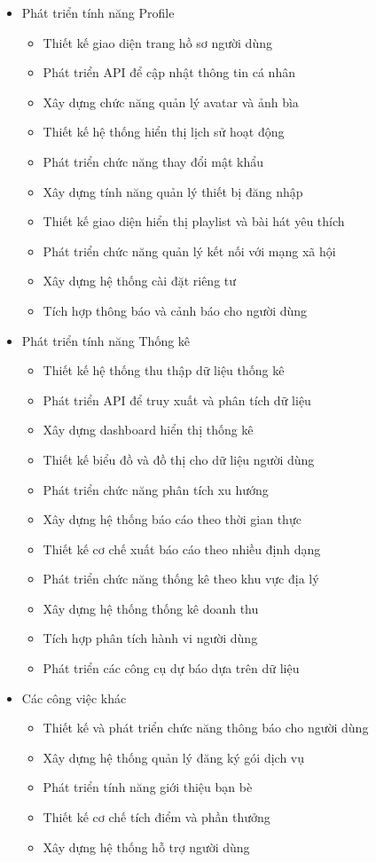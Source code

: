 \begin{itemize}
    \item Phát triển tính năng Profile
    \begin{itemize}
        \item Thiết kế giao diện trang hồ sơ người dùng
        \item Phát triển API để cập nhật thông tin cá nhân
        \item Xây dựng chức năng quản lý avatar và ảnh bìa
        \item Thiết kế hệ thống hiển thị lịch sử hoạt động
        \item Phát triển chức năng thay đổi mật khẩu
        \item Xây dựng tính năng quản lý thiết bị đăng nhập
        \item Thiết kế giao diện hiển thị playlist và bài hát yêu thích
        \item Phát triển chức năng quản lý kết nối với mạng xã hội
        \item Xây dựng hệ thống cài đặt riêng tư
        \item Tích hợp thông báo và cảnh báo cho người dùng
    \end{itemize}
    
    \item Phát triển tính năng Thống kê
    \begin{itemize}
        \item Thiết kế hệ thống thu thập dữ liệu thống kê
        \item Phát triển API để truy xuất và phân tích dữ liệu
        \item Xây dựng dashboard hiển thị thống kê
        \item Thiết kế biểu đồ và đồ thị cho dữ liệu người dùng
        \item Phát triển chức năng phân tích xu hướng
        \item Xây dựng hệ thống báo cáo theo thời gian thực
        \item Thiết kế cơ chế xuất báo cáo theo nhiều định dạng
        \item Phát triển chức năng thống kê theo khu vực địa lý
        \item Xây dựng hệ thống thống kê doanh thu
        \item Tích hợp phân tích hành vi người dùng
        \item Phát triển các công cụ dự báo dựa trên dữ liệu
    \end{itemize}
    
    \item Các công việc khác
    \begin{itemize}
        \item Thiết kế và phát triển chức năng thông báo cho người dùng
        \item Xây dựng hệ thống quản lý đăng ký gói dịch vụ
        \item Phát triển tính năng giới thiệu bạn bè
        \item Thiết kế cơ chế tích điểm và phần thưởng
        \item Xây dựng hệ thống hỗ trợ người dùng
    \end{itemize}
\end{itemize}


